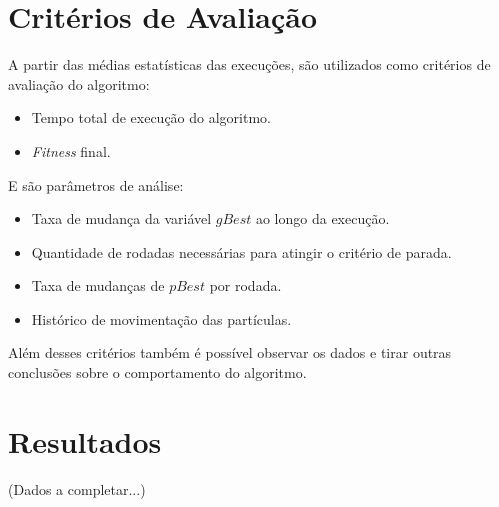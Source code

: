 \section{Critérios de Avaliação}
    A partir das médias estatísticas das execuções, são utilizados como critérios de avaliação do algoritmo: \hfill
    \begin{itemize}
        \item Tempo total de execução do algoritmo.
        \item \textit{Fitness} final.
    \end{itemize}
    
    \noindent E são parâmetros de análise:\hfill
    \begin{itemize}
        \item Taxa de mudança da variável $gBest$ ao longo da execução.
        \item Quantidade de rodadas necessárias para atingir o critério de parada.
        \item Taxa de mudanças de $pBest$ por rodada.
        \item Histórico de movimentação das partículas.
    \end{itemize}

    Além desses critérios também é possível observar os dados e tirar outras conclusões sobre o comportamento do algoritmo.\hfill
    


\section{Resultados}
    (Dados a completar...)
